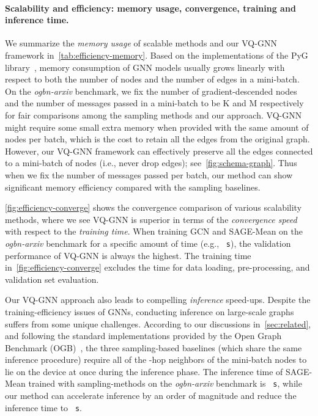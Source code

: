 \documentclass{article}
\newcommand{\cm}{\paragraph}
\renewcommand{\emph}[1]{\textit{#1}}
\newcommand{\siunit}[2]{\texttt{ #2}}
\begin{document}
\cm{Scalability and efficiency: memory usage, convergence, training and inference time.}
We summarize the \emph{memory usage} of scalable methods and our VQ-GNN framework in~\cref{tab:efficiency-memory}. Based on the implementations of the PyG library~\cite{fey2019fast}, memory consumption of GNN models usually grows linearly with respect to both the number of nodes and the number of edges in a mini-batch. On the \textit{ogbn-arxiv} benchmark, we fix the number of gradient-descended nodes and the number of messages passed in a mini-batch to be K and M respectively for fair comparisons among the sampling methods and our approach. VQ-GNN might require some small extra memory when provided with the same amount of nodes per batch, which is the cost to retain all the edges from the original graph. However, our VQ-GNN framework can effectively preserve all the edges connected to a mini-batch of nodes (i.e., never drop edges); see~\cref{fig:schema-graph}. Thus when we fix the number of messages passed per batch, our method can show significant memory efficiency compared with the sampling baselines.

\cref{fig:efficiency-converge} shows the convergence comparison of various scalability methods, where we see VQ-GNN is superior in terms of the \emph{convergence speed} with respect to the \emph{training time}. When training GCN and SAGE-Mean on the \textit{ogbn-arxiv} benchmark for a specific amount of time (e.g., \siunit{100}{s}), the validation performance of VQ-GNN is always the highest. The training time in~\cref{fig:efficiency-converge} excludes the time for data loading, pre-processing, and validation set evaluation.

Our VQ-GNN approach also leads to compelling \emph{inference} speed-ups. Despite the training-efficiency issues of GNNs, conducting inference on large-scale graphs suffers from some unique challenges. According to our discussions in~\cref{sec:related}, and following the standard implementations provided by the Open Graph Benchmark (OGB)~\citep{hu2020open}, the three sampling-based baselines (which share the same inference procedure) require all of the -hop neighbors of the mini-batch nodes to lie on the device at once during the inference phase. The inference time of SAGE-Mean trained with sampling-methods on the \textit{ogbn-arxiv} benchmark is \siunit{1.61}{s}, while our method can accelerate inference by an order of magnitude and reduce the inference time to \siunit{0.40}{s}.
\end{document}

